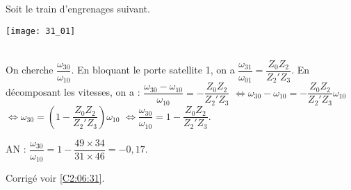 \normaltrue \difficilefalse \tdifficilefalse
\correctiontrue


\setcounter{question}{0}
\ifcorrection
\else
{}
\fi

\ifprof
\else
Soit le train d'engrenages suivant. 
\begin{center}
\texttt{[image: 31\_01]}
\end{center}
\fi


\ifprof
\else
{}
\fi

\ifprof
\else
\fi

\ifprof ~\\
On cherche $\dfrac{\omega_{30}}{\omega_{10}}$. En bloquant le porte satellite 1, on a  
$\dfrac{\omega_{31}}{\omega_{01}}=\dfrac{Z_0 Z_2 }{Z_2' Z_3}$. En décomposant les vitesses, on a :
$\dfrac{\omega_{30}-\omega_{10}}{\omega_{10}}=-\dfrac{Z_0 Z_2 }{Z_2' Z_3}$
$\Leftrightarrow \omega_{30}-\omega_{10}=-\dfrac{Z_0 Z_2 }{Z_2' Z_3}\omega_{10}$
$\Leftrightarrow \omega_{30}=\left(1-\dfrac{Z_0 Z_2 }{Z_2' Z_3}\right)\omega_{10}$
$\Leftrightarrow \dfrac{\omega_{30}}{\omega_{10}}=1-\dfrac{Z_0 Z_2 }{Z_2' Z_3}$.

AN : $ \dfrac{\omega_{30}}{\omega_{10}}=1-\dfrac{49 \times 34}{31 \times 46}=-0,17$.
\else
\fi




\ifprof
\else
\begin{flushright}
\footnotesize{Corrigé  voir \ref{C2:06:31}.}
\end{flushright}%
\fi